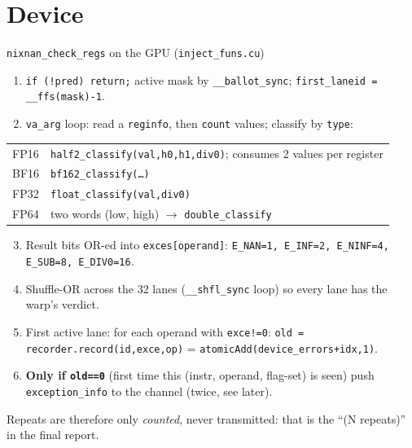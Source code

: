 \documentclass[aspectratio=169,10pt]{beamer}
\begin{document}
\section{Device}
\begin{frame}[fragile]{\texttt{nixnan\_check\_regs} on the GPU (\texttt{inject\_funs.cu})}
\small
\begin{enumerate}
\item \texttt{if (!pred) return;}  \quad active mask by \texttt{\_\_ballot\_sync}; \texttt{first\_laneid = \_\_ffs(mask)-1}.
\item \texttt{va\_arg} loop: read a \texttt{reginfo}, then \texttt{count} values; classify by \texttt{type}:
\end{enumerate}
\begin{tabular}{@{}ll@{}}
FP16 & \texttt{half2\_classify(val,h0,h1,div0)}; consumes 2 values per register\\
BF16 & \texttt{bf162\_classify(\dots)}\\
FP32 & \texttt{float\_classify(val,div0)}\\
FP64 & two words (low, high) $\to$ \texttt{double\_classify}\\
\end{tabular}
\begin{enumerate}\setcounter{enumi}{2}
\item Result bits OR-ed into \texttt{exces[operand]}: \texttt{E\_NAN=1, E\_INF=2, E\_NINF=4, E\_SUB=8, E\_DIV0=16}.
\item Shuffle-OR across the 32 lanes (\texttt{\_\_shfl\_sync} loop) so every lane has the warp's verdict.
\item First active lane: for each operand with \texttt{exce!=0}: \texttt{old = recorder.record(id,exce,op)} = \texttt{atomicAdd(device\_errors+idx,1)}.
\item \textbf{Only if \texttt{old==0}} (first time this (instr, operand, flag-set) is seen) push \texttt{exception\_info} to the channel (twice, see later).
\end{enumerate}
Repeats are therefore only \emph{counted}, never transmitted: that is the ``(N repeats)'' in the final report.
\end{frame}
\end{document}
